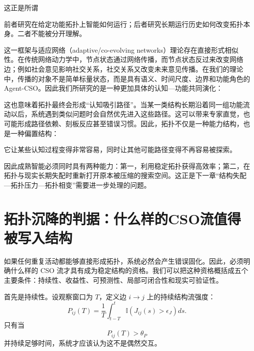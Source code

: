 这正是所谓
\begin{statementbox}
\centering
{}
\end{statementbox}

前者研究在给定功能拓扑上智能如何运行；后者研究长期运行历史如何改变拓扑本身。二者不能被分开理解。

这一框架与适应网络（adaptive/co-evolving networks）理论存在直接形式相似性。在传统网络动力学中，节点状态通过网络传播，而节点状态反过来改变网络边；例如社会意见影响社交关系，社交关系又改变未来意见传播。在我们的理论中，传播的对象不是简单标量状态，而是具有语义、时间尺度、边界和功能角色的 Agent-CSO。因此我们所研究的是一种更加具体的认知—功能共同演化：
\begin{statementbox}
\centering
{}
\end{statementbox}

这也意味着拓扑最终会形成``认知吸引路径''。当某一类结构长期沿着同一组功能流动以后，系统遇到类似问题时会自然优先进入这些路径。这可以带来专家直觉，也可能形成路径依赖、刻板反应甚至错误习惯。因此，拓扑不仅是一种能力结构，也是一种偏置结构：
\begin{statementbox}
\centering
{}
\end{statementbox}
它让某些认知过程变得非常容易，同时让其他可能路径变得不再容易被探索。

因此成熟智能必须同时具有两种能力：第一，利用稳定拓扑获得高效率；第二，在拓扑与现实长期失配时重新打开原本被压缩的搜索空间。这正是下一章``结构失配—拓扑压力—拓扑相变''需要进一步处理的问题。


\section{拓扑沉降的判据：什么样的CSO流值得被写入结构}

如果任何重复活动都能够直接形成拓扑，系统必然会产生错误固化。因此，必须明确什么样的 CSO 流才具有成为稳定结构的资格。我们可以把这种资格概括成五个主要条件：持续性、收益性、可预测性、局部可闭合性和现实可验证性。

首先是持续性。设观察窗口为 $T$，定义边 $i\rightarrow j$ 上的持续结构流强度：
\[
P_{ij}(T)
=
\frac{1}{T}
\int_{t-T}^{t}
\mathbb{I}
\left(
J_{ij}(s)>\epsilon_J
\right)
ds.
\]
只有当
\[
P_{ij}(T)>\theta_P
\]
并持续足够时间，系统才应该认为这不是偶然交互。

